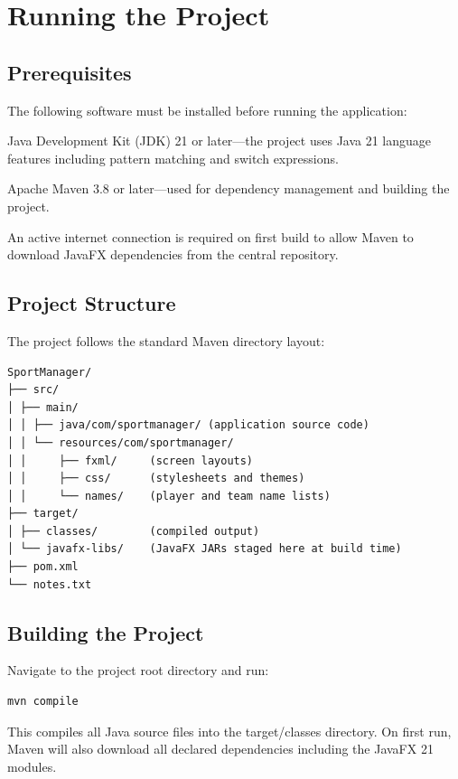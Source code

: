 \documentclass[11pt,a4paper]{article}
\begin{document}
\section{Running the Project}

\subsection*{Prerequisites}

The following software must be installed before running the application:

Java Development Kit (JDK) 21 or later---the project uses Java 21 language features including pattern matching and switch expressions.

Apache Maven 3.8 or later---used for dependency management and building the project.

An active internet connection is required on first build to allow Maven to download JavaFX dependencies from the central repository.

\subsection*{Project Structure}

The project follows the standard Maven directory layout:

\begin{verbatim}
SportManager/
├── src/
│ ├── main/
│ │ ├── java/com/sportmanager/ (application source code)
│ │ └── resources/com/sportmanager/
│ │     ├── fxml/     (screen layouts)
│ │     ├── css/      (stylesheets and themes)
│ │     └── names/    (player and team name lists)
├── target/
│ ├── classes/        (compiled output)
│ └── javafx-libs/    (JavaFX JARs staged here at build time)
├── pom.xml
└── notes.txt
\end{verbatim}

\subsection*{Building the Project}

Navigate to the project root directory and run:

\begin{verbatim}
mvn compile
\end{verbatim}

This compiles all Java source files into the target/classes directory. On first run, Maven will also download all declared dependencies including the JavaFX 21 modules.
\end{document}
